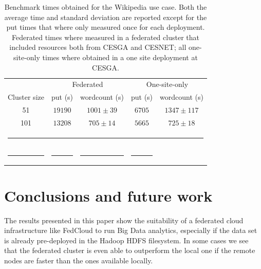 \documentclass[oribibl]{llncs_Ibergrid2013}
\begin{document}
\begin{table}[h!]
\caption{Benchmark times obtained for the Wikipedia use case. Both the average time and standard deviation are reported except for the put times that where only measured once for each deployment. Federated times where measured in a federated cluster that included resources both from CESGA and CESNET; all one-site-only times where obtained in a one site deployment at CESGA. }
\label{table:wikipedia}
%
\vspace{-0.5em}
%
\begin{center}
\begin{tabular}{ccccc}
\toprule
    					& \multicolumn{2}{c}{Federated} 		& \multicolumn{2}{c}{One-site-only} \\
Cluster size				& put (s)		& wordcount (s) 	& put (s)		& wordcount (s)\\
\midrule
51                   			& $19190$		& $1001\pm39$      	& $6705$		& $1347\pm117$\\
101                  			& $13208$		& $705\pm14$      	& $5665$		& $725\pm18$\\
%
\bottomrule
\multicolumn{5}{c}{\rule{0.98\textwidth}{0em}}\\
\rule{0.3\textwidth}{0cm} & \rule{0.2\textwidth}{0cm} & \rule{0.2\textwidth}{0cm} &  \rule{0.2\textwidth}{0cm} & \\
\end{tabular}
\end{center}
\end{table}



\section{Conclusions and future work}
\label{sect-conclusions}
The results presented in this paper show the suitability of a federated cloud infrastructure like FedCloud to run Big Data analytics, especially if the data set is already pre-deployed in the Hadoop HDFS filesystem. In some cases we see that the federated cluster is even able to outperform the local one if the remote nodes are faster than the ones available locally.
\end{document}
